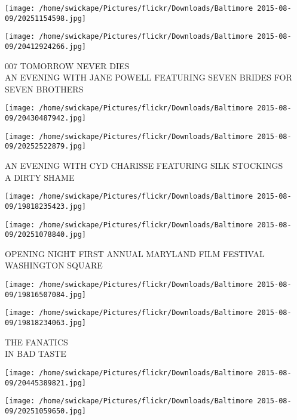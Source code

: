 \documentclass[10pt,letterpaper]{article}
\begin{document}
\texttt{[image: /home/swickape/Pictures/flickr/Downloads/Baltimore 2015-08-09/20251154598.jpg]}

\vspace{0.25in}
\texttt{[image: /home/swickape/Pictures/flickr/Downloads/Baltimore 2015-08-09/20412924266.jpg]}

007 TOMORROW NEVER DIES\\
AN EVENING WITH JANE POWELL FEATURING SEVEN BRIDES FOR SEVEN BROTHERS\\
\pagebreak

\texttt{[image: /home/swickape/Pictures/flickr/Downloads/Baltimore 2015-08-09/20430487942.jpg]}

\vspace{0.25in}
\texttt{[image: /home/swickape/Pictures/flickr/Downloads/Baltimore 2015-08-09/20252522879.jpg]}

AN EVENING WITH CYD CHARISSE FEATURING SILK STOCKINGS\\
A DIRTY SHAME\\
\pagebreak

\texttt{[image: /home/swickape/Pictures/flickr/Downloads/Baltimore 2015-08-09/19818235423.jpg]}

\vspace{0.25in}
\texttt{[image: /home/swickape/Pictures/flickr/Downloads/Baltimore 2015-08-09/20251078840.jpg]}

OPENING NIGHT FIRST ANNUAL MARYLAND FILM FESTIVAL\\
WASHINGTON SQUARE\\
\pagebreak

\texttt{[image: /home/swickape/Pictures/flickr/Downloads/Baltimore 2015-08-09/19816507084.jpg]}

\vspace{0.25in}
\texttt{[image: /home/swickape/Pictures/flickr/Downloads/Baltimore 2015-08-09/19818234063.jpg]}

THE FANATICS\\
IN BAD TASTE\\
\pagebreak

\texttt{[image: /home/swickape/Pictures/flickr/Downloads/Baltimore 2015-08-09/20445389821.jpg]}

\vspace{0.25in}
\texttt{[image: /home/swickape/Pictures/flickr/Downloads/Baltimore 2015-08-09/20251059650.jpg]}
\end{document}
